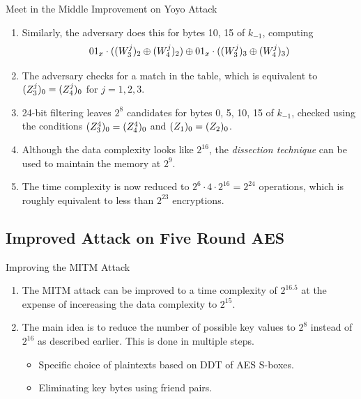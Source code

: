 \documentclass[notheorems]{beamer}
\theoremstyle{definition}
\theoremstyle{example}
\begin{document}
    \begin{frame}[<+->]{Meet in the Middle Improvement on Yoyo Attack}
        \begin{enumerate}
            \conti
            \item Similarly, the adversary does this for bytes 10, 15 of
            \(k_{-1}\), computing
            \begin{equation}
                01_x \cdot ((W_3^j)_2 \oplus (W_4^j)_2) \oplus 01_x \cdot ((W_3^j)_3 \oplus (W_4^j)_3)
                \label{eq:mitm-10-15}
            \end{equation}
            \item The adversary checks for a match in the table, which is
            equivalent to \((Z_3^j)_0 = (Z_4^j)_0\) for \(j = 1, 2,
            3\).
            \item 24-bit filtering leaves \(2^8\) candidates for bytes 0, 5, 10,
            15 of \(k_{-1}\), checked using the conditions \((Z_3^4)_0 =
            (Z_4^4)_0\) and \((Z_1)_0 = (Z_2)_0\).
            \item Although the data complexity looks like \(2^{16}\), the
            \emph{dissection technique} can be used to maintain the memory at
            \(2^9\).
            \item The time complexity is now reduced to \(2^6 \cdot 4 \cdot
            2^{16} = 2^{24}\) operations, which is roughly equivalent to less
            than \(2^{23}\) encryptions.
        \end{enumerate} 
    \end{frame}

    \subsection{Improved Attack on Five Round AES}
    \label{subsec:improved-mitm}

    \begin{frame}[<+->]{Improving the MITM Attack}
        \begin{enumerate}
            \item The MITM attack can be improved to a time complexity of
            \(2^{16.5}\) at the expense of incereasing the data complexity to
            \(2^{15}\).
            \item The main idea is to reduce the number of possible key values
            to \(2^8\) instead of \(2^{16}\) as described earlier. This is done
            in multiple steps.
            \begin{itemize}
                \item Specific choice of plaintexts based on DDT of AES S-boxes.
                \item Eliminating key bytes using friend pairs.
            \end{itemize}
        \end{enumerate}
    \end{frame}
\end{document}
